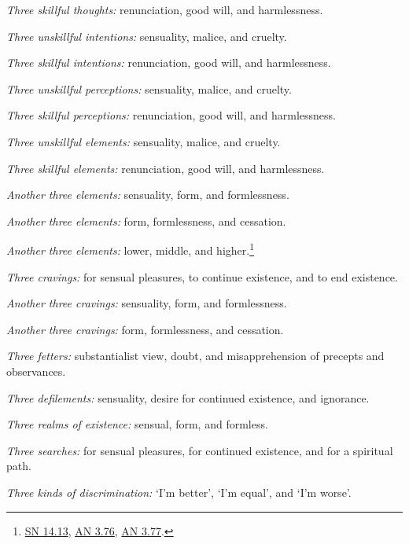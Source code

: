 \documentclass[12pt,openany]{book}%
\begin{document}
\emph{Three skillful thoughts:} renunciation, good will, and harmlessness. 

\emph{Three unskillful intentions:} sensuality, malice, and cruelty. 

\emph{Three skillful intentions:} renunciation, good will, and harmlessness. 

\emph{Three unskillful perceptions:} sensuality, malice, and cruelty. 

\emph{Three skillful perceptions:} renunciation, good will, and harmlessness. 

\emph{Three unskillful elements:} sensuality, malice, and cruelty. 

\emph{Three skillful elements:} renunciation, good will, and harmlessness. 

\emph{Another three elements:} sensuality, form, and formlessness. 

\emph{Another three elements:} form, formlessness, and cessation. 

\emph{Another three elements:} lower, middle, and higher.\footnote{\href{https://suttacentral.net/sn14.13/en/sujato}{SN 14.13}, \href{https://suttacentral.net/an3.76/en/sujato}{AN 3.76}, \href{https://suttacentral.net/an3.77/en/sujato}{AN 3.77}. } 

\emph{Three cravings:} for sensual pleasures, to continue existence, and to end existence. 

\emph{Another three cravings:} sensuality, form, and formlessness. 

\emph{Another three cravings:} form, formlessness, and cessation. 

\emph{Three fetters:} substantialist view, doubt, and misapprehension of precepts and observances. 

\emph{Three defilements:} sensuality, desire for continued existence, and ignorance. 

\emph{Three realms of existence:} sensual, form, and formless. 

\emph{Three searches:} for sensual pleasures, for continued existence, and for a spiritual path. 

\emph{Three kinds of discrimination:} ‘I’m better’, ‘I’m equal’, and ‘I’m worse’. 
\end{document}
